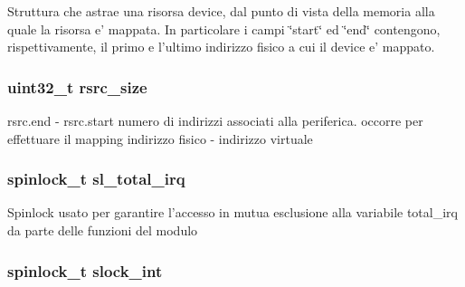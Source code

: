 Struttura che astrae una risorsa device, dal punto di vista della memoria alla quale la risorsa e' mappata. In particolare i campi \char`\"{}start\char`\"{} ed \char`\"{}end\char`\"{} contengono, rispettivamente, il primo e l'ultimo indirizzo fisico a cui il device e' mappato. \hypertarget{structmy_g_p_i_o_k__t_a0f87b53dc5049a349ef01aa586c0b5dc}{
\subsubsection[{rsrc\+\_\+size}]{\setlength{\rightskip}{0pt plus 5cm}uint32\+\_\+t rsrc\+\_\+size}}\label{structmy_g_p_i_o_k__t_a0f87b53dc5049a349ef01aa586c0b5dc}
rsrc.\+end -\/ rsrc.\+start numero di indirizzi associati alla periferica. occorre per effettuare il mapping indirizzo fisico -\/ indirizzo virtuale \hypertarget{structmy_g_p_i_o_k__t_ac41bbc7fe03ef25b7f468275fb565d78}{
\subsubsection[{sl\+\_\+total\+\_\+irq}]{\setlength{\rightskip}{0pt plus 5cm}spinlock\+\_\+t sl\+\_\+total\+\_\+irq}}\label{structmy_g_p_i_o_k__t_ac41bbc7fe03ef25b7f468275fb565d78}
Spinlock usato per garantire l'accesso in mutua esclusione alla variabile total\+\_\+irq da parte delle funzioni del modulo \hypertarget{structmy_g_p_i_o_k__t_a1e1ddf972b4dc84dd331a0c72e5d9895}{
\subsubsection[{slock\+\_\+int}]{\setlength{\rightskip}{0pt plus 5cm}spinlock\+\_\+t slock\+\_\+int}}\label{structmy_g_p_i_o_k__t_a1e1ddf972b4dc84dd331a0c72e5d9895}
